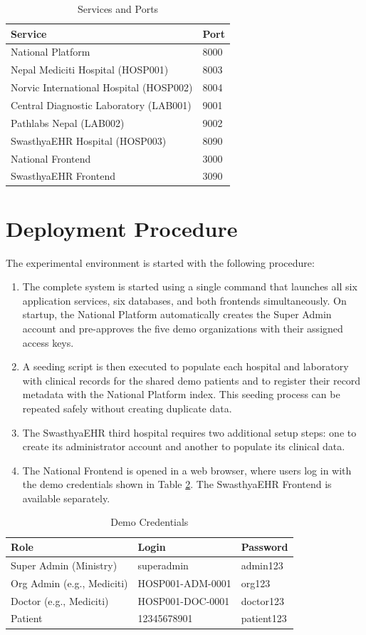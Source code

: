 \documentclass[12pt]{report}
\numberwithin{equation}{chapter}
\begin{document}
\begin{table}[H]
\centering
\caption{Services and Ports}
\label{tab:ports}
\begin{tabular}{|l|l|}
\hline
\textbf{Service} & \textbf{Port} \\ \hline
National Platform & 8000 \\
Nepal Mediciti Hospital (HOSP001) & 8003 \\
Norvic International Hospital (HOSP002) & 8004 \\
Central Diagnostic Laboratory (LAB001) & 9001 \\
Pathlabs Nepal (LAB002) & 9002 \\
SwasthyaEHR Hospital (HOSP003) & 8090 \\
National Frontend & 3000 \\
SwasthyaEHR Frontend & 3090 \\ \hline
\end{tabular}
\end{table}

\section{Deployment Procedure}
The experimental environment is started with the following procedure:
\begin{enumerate}
    \item The complete system is started using a single command that launches all six application services, six databases, and both frontends simultaneously. On startup, the National Platform automatically creates the Super Admin account and pre-approves the five demo organizations with their assigned access keys.
    \item A seeding script is then executed to populate each hospital and laboratory with clinical records for the shared demo patients and to register their record metadata with the National Platform index. This seeding process can be repeated safely without creating duplicate data.
    \item The SwasthyaEHR third hospital requires two additional setup steps: one to create its administrator account and another to populate its clinical data.
    \item The National Frontend is opened in a web browser, where users log in with the demo credentials shown in Table \ref{tab:credentials}. The SwasthyaEHR Frontend is available separately.
\end{enumerate}

\begin{table}[H]
\centering
\caption{Demo Credentials}
\label{tab:credentials}
\begin{tabular}{|l|l|l|}
\hline
\textbf{Role} & \textbf{Login} & \textbf{Password} \\ \hline
Super Admin (Ministry) & superadmin & admin123 \\
Org Admin (e.g., Mediciti) & HOSP001-ADM-0001 & org123 \\
Doctor (e.g., Mediciti) & HOSP001-DOC-0001 & doctor123 \\
Patient & 12345678901 & patient123 \\ \hline
\end{tabular}
\end{table}
\end{document}
